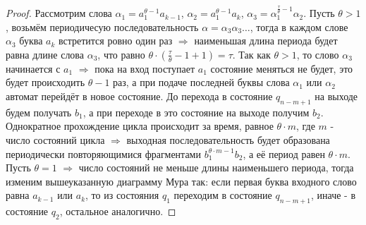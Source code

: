 \documentclass[a4paper, 12pt]{article}
\theoremstyle{definition}
\theoremstyle{plain}
\theoremstyle{remark}
\begin{document}
\begin{proof}
    Рассмотрим слова $\alpha_1=a_1^{\theta-1}a_{k-1}$, $\alpha_2=a_1^{\theta-1}a_k$, $\alpha_3=\alpha_1^{\frac{\tau}{\theta}-1}\alpha_2$. Пусть $\theta>1$, возьмём периодичесую последовательность $\alpha=\alpha_3\alpha_3\ldots$, тогда в каждом слове $\alpha_3$ буква $a_k$ встретится ровно один раз $\Longrightarrow$ наименьшая длина периода будет равна длине слова $\alpha_3$, что равно $\theta\cdot(\frac{\tau}{\theta}-1+1)=\tau$. Так как $\theta>1$, то слово $\alpha_3$ начинается с $a_1$ $\Longrightarrow$ пока на вход поступает $a_1$ состояние меняться не будет, это будет происходить $\theta-1$ раз, а при подаче последней буквы слова $\alpha_1$ или $\alpha_2$ автомат перейдёт в новое состояние. До перехода в состояние $q_{n-m+1}$ на выходе будем получать $b_1$, а при переходе в это состояние на выходе получим $b_2$. Однократное прохождение цикла происходит за время, равное $\theta\cdot m$, где $m$ - число состояний цикла $\Longrightarrow$ выходная последовательность будет образована периодически повторяющимися фрагментами $b_1^{\theta\cdot m-1}b_2$, а её период равен $\theta\cdot m$.\\
    Пусть $\theta=1$ $\Longrightarrow$ число состояний не меньше длины наименьшего периода, тогда изменим вышеуказанную диаграмму Мура так: если первая буква входного слово равна $a_{k-1}$ или $a_k$, то из состояния $q_1$ переходим в состояние $q_{n-m+1}$, иначе - в состояние $q_2$, остальное аналогично.
  \end{proof}
\end{document}
